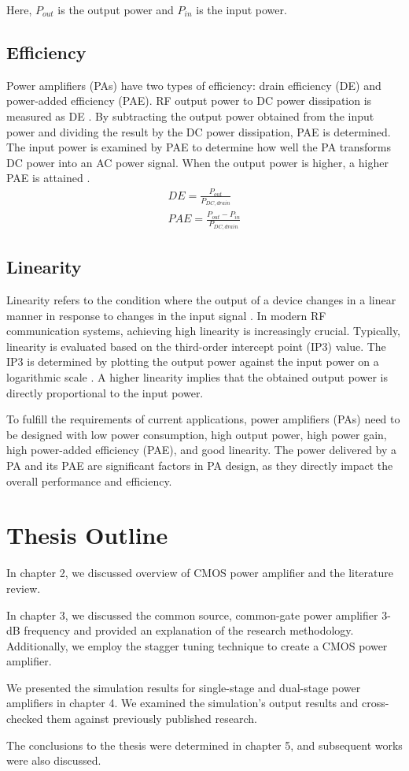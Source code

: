 Here, $P_{out}$ is the output power and $P_{in}$ is the input power.

\subsection{Efficiency}
Power amplifiers (PAs) have two types of efficiency: drain efficiency (DE) and power-added efficiency (PAE). RF output power to DC power dissipation is measured as DE \cite{fifteenth}. By subtracting the output power obtained from the input power and dividing the result by the DC power dissipation, PAE is determined. The input power is examined by PAE to determine how well the PA transforms DC power into an AC power signal. When the output power is higher, a higher PAE is attained \cite{fifteenth}. 
\begin{align}
    DE=\frac{P_{out}}{P_{DC, drain}}\\
    PAE=\frac{P_{out}-P_{in}}{P_{DC, drain}}
\end{align}

\subsection{Linearity}
Linearity refers to the condition where the output of a device changes in a linear manner in response to changes in the input signal \cite{sixteen}. In modern RF communication systems, achieving high linearity is increasingly crucial. Typically, linearity is evaluated based on the third-order intercept point (IP3) value. The IP3 is determined by plotting the output power against the input power on a logarithmic scale \cite{sixteen}. A higher linearity implies that the obtained output power is directly proportional to the input power.

To fulfill the requirements of current applications, power amplifiers (PAs) need to be designed with low power consumption, high output power, high power gain, high power-added efficiency (PAE), and good linearity. The power delivered by a PA and its PAE are significant factors in PA design, as they directly impact the overall performance and efficiency.
\section{Thesis Outline}
In chapter 2, we discussed overview of CMOS power amplifier and the literature review.

In chapter 3, we discussed the common source, common-gate power amplifier 3-dB frequency and provided an explanation of the research methodology. Additionally, we employ the stagger tuning technique to create a CMOS power amplifier.

We presented the simulation results for single-stage and dual-stage power amplifiers in chapter 4. We examined the simulation's output results and cross-checked them against previously published research.

The conclusions to the thesis were determined in chapter 5, and subsequent works were also discussed. 